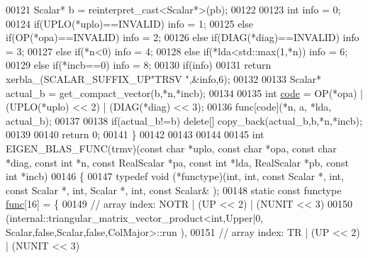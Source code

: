 \begin{DoxyCode}
00121   Scalar* b = \textcolor{keyword}{reinterpret\_cast<}Scalar*\textcolor{keyword}{>}(pb);
00122 
00123   \textcolor{keywordtype}{int} info = 0;
00124   \textcolor{keywordflow}{if}(UPLO(*uplo)==INVALID)                                            info = 1;
00125   \textcolor{keywordflow}{else} \textcolor{keywordflow}{if}(OP(*opa)==INVALID)                                          info = 2;
00126   \textcolor{keywordflow}{else} \textcolor{keywordflow}{if}(DIAG(*diag)==INVALID)                                       info = 3;
00127   \textcolor{keywordflow}{else} \textcolor{keywordflow}{if}(*n<0)                                                       info = 4;
00128   \textcolor{keywordflow}{else} \textcolor{keywordflow}{if}(*lda<std::max(1,*n))                                        info = 6;
00129   \textcolor{keywordflow}{else} \textcolor{keywordflow}{if}(*incb==0)                                                   info = 8;
00130   \textcolor{keywordflow}{if}(info)
00131     \textcolor{keywordflow}{return} xerbla\_(SCALAR\_SUFFIX\_UP\textcolor{stringliteral}{"TRSV "},&info,6);
00132 
00133   Scalar* actual\_b = get\_compact\_vector(b,*n,*incb);
00134 
00135   \textcolor{keywordtype}{int} \hyperlink{structcode}{code} = OP(*opa) | (UPLO(*uplo) << 2) | (DIAG(*diag) << 3);
00136   func[code](*n, a, *lda, actual\_b);
00137 
00138   \textcolor{keywordflow}{if}(actual\_b!=b) \textcolor{keyword}{delete}[] copy\_back(actual\_b,b,*n,*incb);
00139 
00140   \textcolor{keywordflow}{return} 0;
00141 \}
00142 
00143 
00144 
00145 \textcolor{keywordtype}{int} EIGEN\_BLAS\_FUNC(trmv)(\textcolor{keyword}{const} \textcolor{keywordtype}{char} *uplo, \textcolor{keyword}{const} \textcolor{keywordtype}{char} *opa, \textcolor{keyword}{const} \textcolor{keywordtype}{char} *diag, \textcolor{keyword}{const} \textcolor{keywordtype}{int} *n, \textcolor{keyword}{const} 
      RealScalar *pa, \textcolor{keyword}{const} \textcolor{keywordtype}{int} *lda, RealScalar *pb, \textcolor{keyword}{const} \textcolor{keywordtype}{int} *incb)
00146 \{
00147   \textcolor{keyword}{typedef} void (*functype)(int, int, \textcolor{keyword}{const} Scalar *, int, \textcolor{keyword}{const} Scalar *, int, Scalar *, int, \textcolor{keyword}{const} Scalar&
      );
00148   \textcolor{keyword}{static} \textcolor{keyword}{const} functype \hyperlink{structfunc}{func}[16] = \{
00149     \textcolor{comment}{// array index: NOTR  | (UP << 2) | (NUNIT << 3)}
00150     (internal::triangular\_matrix\_vector\_product<int,Upper|0,       Scalar,false,Scalar,false,ColMajor>::run
      ),
00151     \textcolor{comment}{// array index: TR    | (UP << 2) | (NUNIT << 3)}

\end{DoxyCode}
